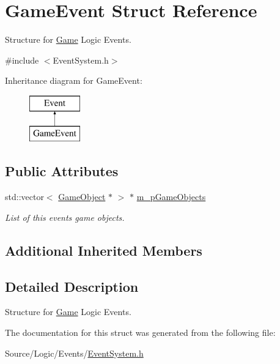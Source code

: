 \hypertarget{struct_game_event}{}\section{Game\+Event Struct Reference}
\label{struct_game_event}


Structure for \mbox{\hyperlink{class_game}{Game}} Logic Events.  




{\ttfamily \#include $<$Event\+System.\+h$>$}

Inheritance diagram for Game\+Event\+:\begin{figure}[H]
\begin{center}
\leavevmode
\includegraphics[height=2.000000cm]{struct_game_event}
\end{center}
\end{figure}
\subsection*{Public Attributes}
\begin{DoxyCompactItemize}
\item 
\mbox{\label{struct_game_event_a1ee24a4ec74cbe87a4b1eb634000a324}} 
std\+::vector$<$ \mbox{\hyperlink{class_game_object}{Game\+Object}} $\ast$ $>$ $\ast$ \mbox{\hyperlink{struct_game_event_a1ee24a4ec74cbe87a4b1eb634000a324}{m\+\_\+p\+Game\+Objects}}
\begin{DoxyCompactList}\small\item\em List of this event\textquotesingle{}s game objects. \end{DoxyCompactList}\end{DoxyCompactItemize}
\subsection*{Additional Inherited Members}


\subsection{Detailed Description}
Structure for \mbox{\hyperlink{class_game}{Game}} Logic Events. 

The documentation for this struct was generated from the following file\+:\begin{DoxyCompactItemize}
\item 
Source/\+Logic/\+Events/\mbox{\hyperlink{_event_system_8h}{Event\+System.\+h}}\end{DoxyCompactItemize}

